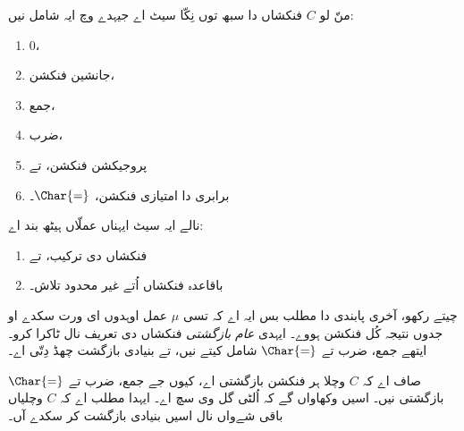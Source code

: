 \documentclass[../../../include/open-logic-section]{subfiles}
\begin{document}

منّ لو $C$ فنکشاں دا سبھ توں نِکّا سیٹ اے جیہدے وچ ایہ شامل نیں:
\begin{enumerate}
\item $0$،
\item جانشین فنکشن،
\item جمع،
\item ضرب،
\item پروجیکشن فنکشن، تے
\item برابری دا امتیازی فنکشن، $\Char{=}$۔
\end{enumerate}
نالے ایہ سیٹ ایہناں عملّاں ہیٹھ بند اے:
\begin{enumerate}
\item فنکشاں دی ترکیب، تے
\item باقاعدہ فنکشاں اُتے غیر محدود تلاش۔
\end{enumerate}
چیتے رکھو، آخری پابندی دا مطلب بس ایہ اے کہ تسی $\mu$ عمل اوہدوں ای ورت سکدے او جدوں نتیجہ کُل فنکشن ہووے۔ ایہدی \emph{عام بازگشتی} فنکشاں دی تعریف نال ٹاکرا کرو۔ ایتھے جمع، ضرب تے $\Char{=}$ شامل کیتے نیں، تے بنیادی بازگشت چھڈ دِتّی اے۔

صاف اے کہ $C$ وچلا ہر فنکشن بازگشتی اے، کیوں جے جمع، ضرب تے $\Char{=}$ بازگشتی نیں۔ اسیں وکھاواں گے کہ اُلٹی گل وی سچ اے۔ ایہدا مطلب اے کہ $C$ وچلیاں باقی شےواں نال اسیں بنیادی بازگشت کر سکدے آں۔
\end{document}
